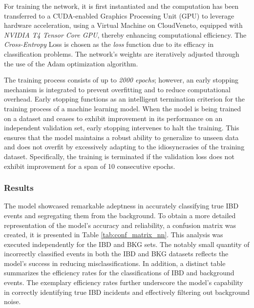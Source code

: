 For training the network, it is first instantiated and the computation has been transferred to a CUDA-enabled Graphics Processing Unit (GPU) to leverage hardware acceleration, using a Virtual Machine on CloudVeneto, equipped with \textit{NVIDIA T4 Tensor Core GPU}, thereby enhancing computational efficiency. The \textit{Cross-Entropy} Loss is chosen as the \textit{loss} function due to its efficacy in classification problems. The network's weights are iteratively adjusted through the use of the Adam optimization algorithm.

The training process consists of up to \textit{2000 epochs}; however, an early stopping mechanism is integrated to prevent overfitting and to reduce computational overhead. Early stopping functions as an intelligent termination criterion for the training process of a machine learning model. When the model is being trained on a dataset and ceases to exhibit improvement in its performance on an independent validation set, early stopping intervenes to halt the training. This ensures that the model maintains a robust ability to generalize to unseen data and does not overfit by excessively adapting to the idiosyncrasies of the training dataset. 
Specifically, the training is terminated if the validation loss does not exhibit improvement for a span of 10 consecutive epochs.


\subsubsection{Results}
The model showcased remarkable adeptness in accurately classifying true IBD events and segregating them from the background. To obtain a more detailed representation of the model's accuracy and reliability, a confusion matrix was created, it is presented in Table \ref{tab:conf_matrix_nn}. This analysis was executed independently for the IBD and BKG sets. The notably small quantity of incorrectly classified events in both the IBD and BKG datasets reflects the model's success in reducing misclassifications. In addition, a distinct table summarizes the efficiency rates for the classifications of IBD and background events. The exemplary efficiency rates further underscore the model's capability in correctly identifying true IBD incidents and effectively filtering out background noise.



